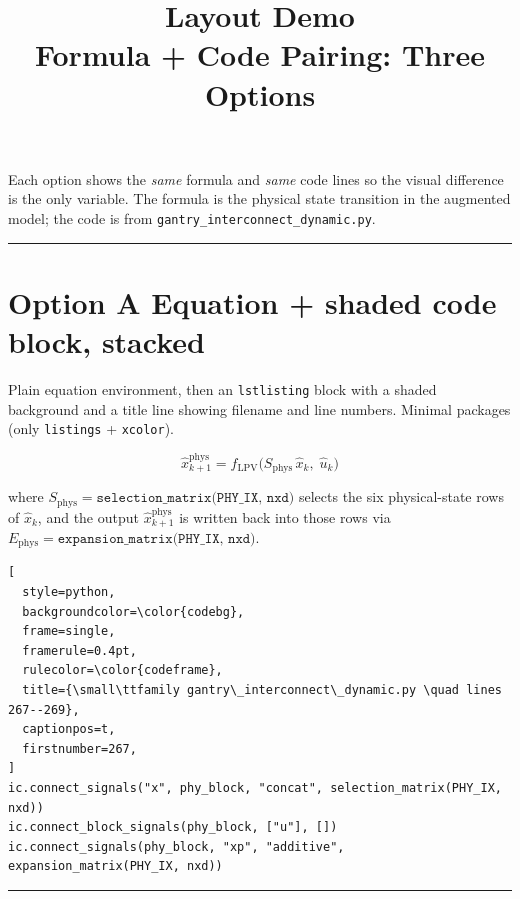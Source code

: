 \documentclass[11pt,a4paper]{article}
\newcommand{\file}[1]{\texttt{\small #1}}
\begin{document}
\title{\textbf{Layout Demo} \\[4pt]
       \large Formula + Code Pairing: Three Options}
\author{}
\date{}
\maketitle

\noindent
Each option shows the \textit{same} formula and \textit{same} code lines so the visual
difference is the only variable. The formula is the physical state transition in the
augmented model; the code is from \file{gantry\_interconnect\_dynamic.py}.

\bigskip
\hrule
\bigskip

\section*{Option A \quad Equation + shaded code block, stacked}

Plain equation environment, then an \texttt{lstlisting} block with a shaded background
and a title line showing filename and line numbers. Minimal packages (only
\texttt{listings} + \texttt{xcolor}).

\begin{equation}
  \hat{x}^{\mathrm{phys}}_{k+1}
  = f_{\mathrm{LPV}}\!\bigl(
      S_{\mathrm{phys}}\,\hat{x}_k,\;
      \hat{u}_k
    \bigr)
  \label{eq:phys_transition}
\end{equation}

where $S_{\mathrm{phys}} = \texttt{selection\_matrix(PHY\_IX, nxd)}$ selects the six
physical-state rows of $\hat{x}_k$, and the output $\hat{x}^{\mathrm{phys}}_{k+1}$ is
written back into those rows via $E_{\mathrm{phys}} = \texttt{expansion\_matrix(PHY\_IX, nxd)}$.

\begin{lstlisting}[
  style=python,
  backgroundcolor=\color{codebg},
  frame=single,
  framerule=0.4pt,
  rulecolor=\color{codeframe},
  title={\small\ttfamily gantry\_interconnect\_dynamic.py \quad lines 267--269},
  captionpos=t,
  firstnumber=267,
]
ic.connect_signals("x", phy_block, "concat", selection_matrix(PHY_IX, nxd))
ic.connect_block_signals(phy_block, ["u"], [])
ic.connect_signals(phy_block, "xp", "additive", expansion_matrix(PHY_IX, nxd))
\end{lstlisting}

\bigskip
\hrule
\bigskip
\end{document}
